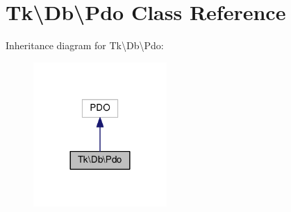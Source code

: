 \hypertarget{classTk_1_1Db_1_1Pdo}{\section{Tk\textbackslash{}Db\textbackslash{}Pdo Class Reference}
\label{classTk_1_1Db_1_1Pdo}
}


Inheritance diagram for Tk\textbackslash{}Db\textbackslash{}Pdo\+:\nopagebreak
\begin{figure}[H]
\begin{center}
\leavevmode
\includegraphics[width=144pt]{classTk_1_1Db_1_1Pdo__inherit__graph}
\end{center}
\end{figure}
